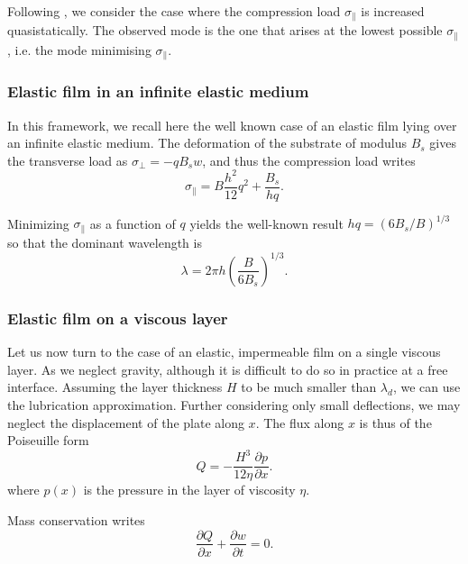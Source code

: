 \documentclass[twocolumn,superscriptaddress,showpacs,preprintnumbers,
amsmath,amssymb,prl]{revtex4-1}
\begin{document}
Following \cite{Biot1957}, we consider the case where the compression load $\sigma_\parallel$ is increased quasistatically. The observed mode is the one that arises at the lowest possible $\sigma_\parallel$, i.e. the mode minimising $\sigma_\parallel$.

\subsubsection*{Elastic film in an infinite elastic medium}

In this framework, we recall here the well known case of an elastic film lying over an infinite elastic medium. The deformation of the substrate of modulus $B_s$ gives the transverse load as $\sigma_\perp = -q B_s w$, and thus the compression load writes
\begin{equation}
\sigma_\parallel = B \frac{h^2}{12} q^2 + \frac{B_s}{hq}.
\label{eq:sigma0}
\end{equation}

Minimizing $\sigma_\parallel$ as a function of $q$ yields the well-known result $hq = \left(6B_s/B\right)^{1/3}$ \cite{Biot1957,Cerda2003} so that the dominant wavelength is 
\begin{equation}
\lambda = 2\pi h \left(\frac{B}{6B_s}\right)^{1/3}.
\label{eq:lambdaElEl}
\end{equation}

\subsubsection*{Elastic film on a viscous layer}
Let us now turn to the case of an elastic, impermeable film on a single viscous layer. As \cite{Huang2002} we neglect gravity, although it is difficult to do so in practice at a free interface. Assuming the layer thickness $H$ to be much smaller than $\lambda_d$, we can use the lubrication approximation. Further considering only small deflections, we may neglect the displacement of the plate along $x$. The flux along $x$ is thus of the Poiseuille form
\begin{equation}
Q = -\frac{H^3}{12\eta}\frac{\partial p}{\partial x}.
\label{eq:PoiseuilleFlux}
\end{equation}
where $p(x)$ is the pressure in the layer of viscosity $\eta$.

Mass conservation writes
\begin{equation}
\frac{\partial Q}{\partial x} + \frac{\partial w}{\partial t} = 0.
\label{eq:conservation}
\end{equation}
\end{document}
